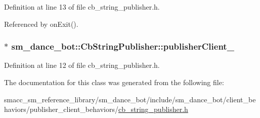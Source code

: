 Definition at line 13 of file cb\+\_\+string\+\_\+publisher.\+h.



Referenced by on\+Exit().

\subsubsection[{\texorpdfstring{publisher\+Client\+\_\+}{publisherClient_}}]{$\ast$ sm\+\_\+dance\+\_\+bot\+::\+Cb\+String\+Publisher\+::publisher\+Client\+\_\+}\hypertarget{classsm__dance__bot_1_1CbStringPublisher_a3444c52fae1bd6d7da8c16c894050b2b}{}\label{classsm__dance__bot_1_1CbStringPublisher_a3444c52fae1bd6d7da8c16c894050b2b}


Definition at line 12 of file cb\+\_\+string\+\_\+publisher.\+h.



The documentation for this class was generated from the following file\+:\begin{DoxyCompactItemize}
\item 
smacc\+\_\+sm\+\_\+reference\+\_\+library/sm\+\_\+dance\+\_\+bot/include/sm\+\_\+dance\+\_\+bot/client\+\_\+behaviors/publisher\+\_\+client\+\_\+behaviors/\hyperlink{cb__string__publisher_8h}{cb\+\_\+string\+\_\+publisher.\+h}\end{DoxyCompactItemize}
